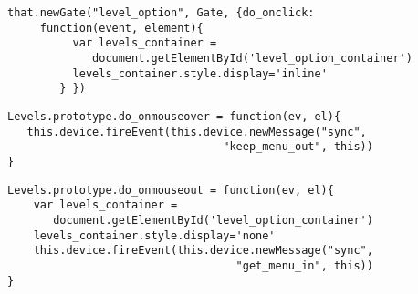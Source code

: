 \begin{lstlisting}[caption=level\_option, label={lst:code5241}]
that.newGate("level_option", Gate, {do_onclick: 
     function(event, element){
          var levels_container = 
             document.getElementById('level_option_container')
          levels_container.style.display='inline'
        } })
\end{lstlisting}

\begin{lstlisting}[caption=do\_onmouseover, label={lst:code5251}]
Levels.prototype.do_onmouseover = function(ev, el){
   this.device.fireEvent(this.device.newMessage("sync",
                                 "keep_menu_out", this))
}
\end{lstlisting}

\begin{lstlisting}[caption=do\_onmouseout, label={lst:code5252}]
Levels.prototype.do_onmouseout = function(ev, el){
    var levels_container = 
       document.getElementById('level_option_container')
    levels_container.style.display='none'
    this.device.fireEvent(this.device.newMessage("sync",
                                   "get_menu_in", this))
}
\end{lstlisting}